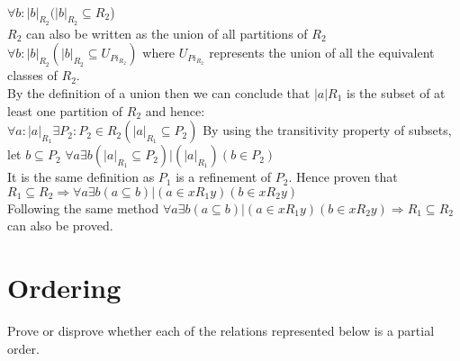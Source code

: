 \documentclass[addpoints]{exam}
\begin{document}
\begin{questions}
\begin{solution}
    \\$\forall b : |b|_{R_2}  (|b|_{R_2} \subseteq R_2$)
    \\$R_2$ can also be written as the union of all partitions of $R_2$
    \\$\forall b : |b|_{R_2} (|b|_{R_2} \subseteq U_{Pi_{R_2}})$ where $U_{Pi_{R_2}}$ represents the union of all the equivalent classes of $R_2.$\\
    By the definition of a union then we can conclude that $|a|R_1$ is the subset of at least one partition of $R_2$ and hence:\\
    $\forall a :  |a|_{R_1} \exists P_2 : P_2 \in R_2 (|a|_{R_1} \subseteq P_2)$
    By using the transitivity property of subsets, let $b \subseteq P_2$
    $\forall a \exists b (|a|_{R_1} \subseteq P_2) | (|a|_{R_1}) (b \in P_2) $\\
    It is the same definition as $P_1$ is a refinement of $P_2$. Hence proven that \\
    $R_1 \subseteq R_2 \Rightarrow \forall a \exists b  (a \subseteq b) | (a \in xR_1y) (b \in xR_2y)$\\
    Following the same method $\forall a \exists b  (a \subseteq b) | (a \in xR_1y) (b \in xR_2y) \Rightarrow R_1 \subseteq R_2$ can also be proved.\\


  \end{solution}

  \section{Ordering}
  
\question Prove or disprove whether each of the relations represented below is a partial order.
  \begin{multicols}{3}
  \end{multicols}
  \begin{solution}
    \begin{parts}

\end{parts}
\end{solution}
\end{questions}
\end{document}
